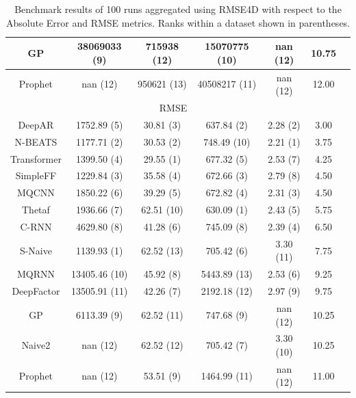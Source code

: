 \begin{table}[htb]
\begin{tabular}{ccccccc}
    GP          & 38069033 (9)          & 715938 (12)            & 15070775 (10)      & nan (12)     & 10.75               \\\hline
    Prophet     & nan (12)              & 950621 (13)            & 40508217 (11)      & nan (12)     & 12.00               \\\hline
    \multicolumn{6}{c}{\cellcolor{gray!25}RMSE}                                                                            \\
    \hline
    DeepAR      & 1752.89 (5)           & 30.81 (3)              & 637.84 (2)         & 2.28 (2)     & 3.00                \\\hline
    N-BEATS     & 1177.71 (2)           & 30.53 (2)              & 748.49 (10)        & 2.21 (1)     & 3.75                \\\hline
    Transformer & 1399.50 (4)           & 29.55 (1)              & 677.32 (5)         & 2.53 (7)     & 4.25                \\\hline
    SimpleFF    & 1229.84 (3)           & 35.58 (4)              & 672.66 (3)         & 2.79 (8)     & 4.50                \\\hline
    MQCNN       & 1850.22 (6)           & 39.29 (5)              & 672.82 (4)         & 2.31 (3)     & 4.50                \\\hline
    Thetaf      & 1936.66 (7)           & 62.51 (10)             & 630.09 (1)         & 2.43 (5)     & 5.75                \\\hline
    C-RNN       & 4629.80 (8)           & 41.28 (6)              & 745.09 (8)         & 2.39 (4)     & 6.50                \\\hline
    S-Naive     & 1139.93 (1)           & 62.52 (13)             & 705.42 (6)         & 3.30 (11)    & 7.75                \\\hline
    MQRNN       & 13405.46 (10)         & 45.92 (8)              & 5443.89 (13)       & 2.53 (6)     & 9.25                \\\hline
    DeepFactor  & 13505.91 (11)         & 42.26 (7)              & 2192.18 (12)       & 2.97 (9)     & 9.75                \\\hline
    GP          & 6113.39 (9)           & 62.52 (11)             & 747.68 (9)         & nan (12)     & 10.25               \\\hline
    Naive2      & nan (12)              & 62.52 (12)             & 705.42 (7)         & 3.30 (10)    & 10.25               \\\hline
    Prophet     & nan (12)              & 53.51 (9)              & 1464.99 (11)       & nan (12)     & 11.00               \\\hline
  \end{tabular}
  \caption{Benchmark results of 100 runs aggregated using RMSE4D with respect to the Absolute Error and RMSE metrics. Ranks within a dataset shown in parentheses.}
  \label{tab:benchmark_results_abs_rmse}
\end{table}

